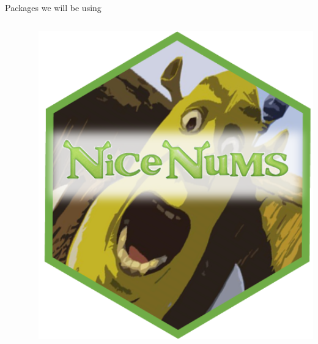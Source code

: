 \documentclass[11pt,a4paper]{beamer}
\begin{document}
\begin{frame}{Packages we will be using}
\begin{columns}
\begin{column}{0.20\textwidth}
\begin{center}
\end{center}
\end{column}

\begin{column}{0.20\textwidth}  
\begin{center}
\includegraphics[width=1\textwidth]{shrek_hex}
\end{center}
\end{column}

\end{columns}

\end{frame}
\end{document}
